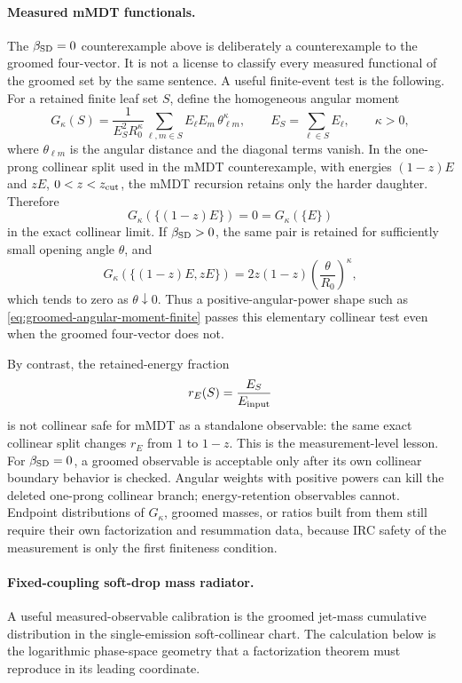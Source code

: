 \paragraph{Measured mMDT functionals.}
The \(\beta_{\rm SD}=0\) counterexample above is deliberately a counterexample
to the groomed four-vector.  It is not a license to classify every measured
functional of the groomed set by the same sentence.  A useful finite-event
test is the following.  For a retained finite leaf set \(S\), define the
homogeneous angular moment
\begin{equation}
  G_\kappa(S)
  =
  \frac{1}{E_S^2R_0^\kappa}
  \sum_{\ell,m\in S}
  E_\ell E_m\,\theta_{\ell m}^{\kappa},
  \qquad
  E_S=\sum_{\ell\in S}E_\ell,
  \qquad
  \kappa>0,
  \label{eq:groomed-angular-moment-finite}
\end{equation}
where \(\theta_{\ell m}\) is the angular distance and the diagonal terms
vanish.  In the one-prong collinear split used in the mMDT counterexample,
with energies \((1-z)E\) and \(zE\), \(0<z<z_{\rm cut}\), the mMDT recursion
retains only the harder daughter.  Therefore
\[
  G_\kappa(\{(1-z)E\})=0=G_\kappa(\{E\})
\]
in the exact collinear limit.  If \(\beta_{\rm SD}>0\), the same pair is
retained for sufficiently small opening angle \(\theta\), and
\[
  G_\kappa(\{(1-z)E,zE\})
  =
  2z(1-z)\left(\frac{\theta}{R_0}\right)^\kappa ,
\]
which tends to zero as \(\theta\downarrow0\).  Thus a positive-angular-power
shape such as \eqref{eq:groomed-angular-moment-finite} passes this elementary
collinear test even when the groomed four-vector does not.

By contrast, the retained-energy fraction
\[
  r_E(S)=\frac{E_S}{E_{\rm input}}
\]
is not collinear safe for mMDT as a standalone observable: the same exact
collinear split changes \(r_E\) from \(1\) to \(1-z\).  This is the
measurement-level lesson.  For \(\beta_{\rm SD}=0\), a groomed observable is
acceptable only after its own collinear boundary behavior is checked.  Angular
weights with positive powers can kill the deleted one-prong collinear branch;
energy-retention observables cannot.  Endpoint distributions of
\(G_\kappa\), groomed masses, or ratios built from them still require their
own factorization and resummation data, because IRC safety of the measurement
is only the first finiteness condition.

\paragraph{Fixed-coupling soft-drop mass radiator.}
A useful measured-observable calibration is the groomed jet-mass cumulative
distribution in the single-emission soft-collinear chart.  The calculation
below is the logarithmic phase-space geometry that a
factorization theorem must reproduce in its leading coordinate.

